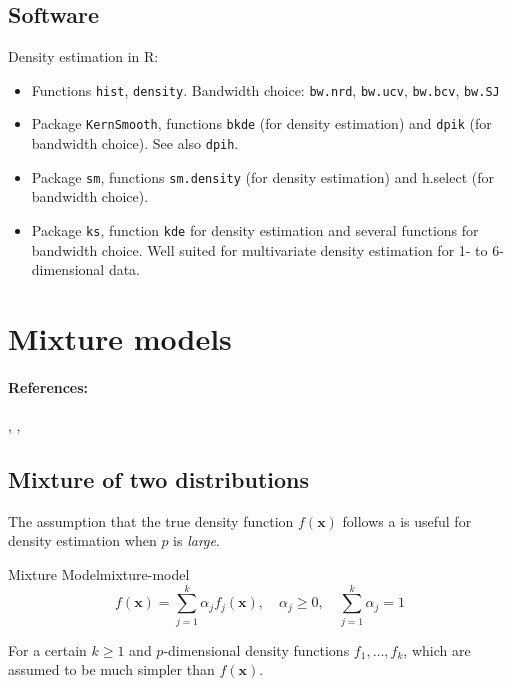 \subsection{Software}
Density estimation in R:
\begin{itemize}
	\item Functions \texttt{hist}, \texttt{density}. Bandwidth choice: \texttt{bw.nrd}, \texttt{bw.ucv},
	      \texttt{bw.bcv}, \texttt{bw.SJ}
	\item Package \texttt{KernSmooth}, functions \texttt{bkde} (for density estimation) and
	      \texttt{dpik} (for bandwidth choice). See also \texttt{dpih}. \cite{wand_kernel_1994}
	\item Package \texttt{sm}, functions \texttt{sm.density} (for density estimation) and
	      h.select (for bandwidth choice). \cite{bowman_applied_1997}
	\item Package \texttt{ks}, function \texttt{kde} for density estimation and several
	      functions for bandwidth choice. Well suited for multivariate density
	      estimation for 1- to 6-dimensional data. \cite{chacon_multivariate_2018}
\end{itemize}

\pagebreak
\section{Mixture models}
\paragraph{References:} \cite[Sections 6.8 and 12.7]{hastie_elements_2009}, \cite[Section 13.1.3]{fan_statistical_2020}, \cite[Chapter 10]{lange_numerical_1999}

\subsection{Mixture of two distributions}

The assumption that the true density function $f(\boldsymbol{x})$ follows
a  is useful for density estimation when $p$ is \emph{large}.

\begin{definition}{Mixture Model}{mixture-model}
	\begin{equation*}
		f(\boldsymbol{x}) = \sum_{j=1}^k \alpha_j f_j(\boldsymbol{x}),\quad \alpha_j \geq 0,\quad \sum_{j=1}^k \alpha_j = 1
	\end{equation*}

	For a certain $k \geq 1$ and $p$-dimensional density functions $f_1, \dots, f_k$,
	which are assumed to be much simpler than $f(\boldsymbol{x})$.
\end{definition}

